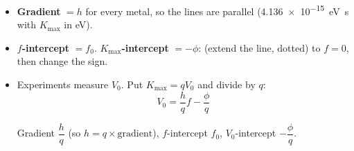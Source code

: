\begin{itemize}
  \item \textbf{Gradient} $= h$ for every metal, so the lines are parallel
        (\qty{4.136e-15}{eV.s} with $K_\mathrm{max}$ in eV).
  \item \textbf{$f$-intercept} $= f_0$. \textbf{$K_\mathrm{max}$-intercept} $= -\phi$:
         (extend the line, dotted) to $f = 0$, then change the sign.
  \item Experiments measure $V_0$. Put $K_\mathrm{max} = qV_0$ and divide by $q$:
        \[V_0 = \frac{h}{q}f - \frac{\phi}{q}\]
        {\centering\hscbadgenotonsheet\par}
        Gradient $\dfrac{h}{q}$ (so $h = q \times \text{gradient}$), $f$-intercept
        $f_0$, $V_0$-intercept $-\dfrac{\phi}{q}$.
\end{itemize}


